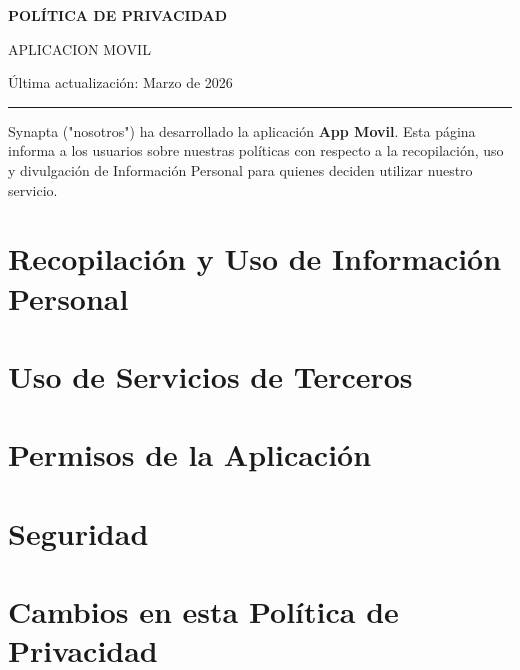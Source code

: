 \documentclass[11pt]{article}
\begin{document}

\begin{center}

{\Huge\bfseries\color{navy} POLÍTICA DE PRIVACIDAD}

\vspace{4pt}

{\Large APLICACION MOVIL}

\vspace{6pt}

\textcolor{textgray}{Última actualización: Marzo de 2026}

\vspace{8pt}

\color{linegray}\rule{0.8\textwidth}{0.8pt}

\end{center}

\vspace{0.8cm}

\noindent
Synapta ("nosotros") ha desarrollado la aplicación \textbf{App Movil}. Esta página informa a los usuarios sobre nuestras políticas con respecto a la recopilación, uso y divulgación de Información Personal para quienes deciden utilizar nuestro servicio.

\section{Recopilación y Uso de Información Personal}

\section{Uso de Servicios de Terceros}


\section{Permisos de la Aplicación}


\section{Seguridad}



\section{Cambios en esta Política de Privacidad}
\end{document}
